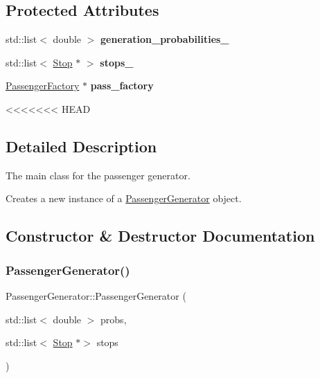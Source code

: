 \subsection*{Protected Attributes}
\begin{DoxyCompactItemize}
\item 
\mbox{\label{classPassengerGenerator_a855471e5532fec3f387a6340f928d43a}} 
std\+::list$<$ double $>$ {\bfseries generation\+\_\+probabilities\+\_\+}
\item 
\mbox{\label{classPassengerGenerator_ab09ab7ca9104385ae007d05a6e957884}} 
std\+::list$<$ \hyperlink{classStop}{Stop} $\ast$ $>$ {\bfseries stops\+\_\+}
\item 
\mbox{\label{classPassengerGenerator_a3fb4e7939da69cd257680761488f39ac}} 
\hyperlink{classPassengerFactory}{Passenger\+Factory} $\ast$ {\bfseries pass\+\_\+factory}
\end{DoxyCompactItemize}


<<<<<<< HEAD
\subsection{Detailed Description}
The main class for the passenger generator. 

Creates a new instance of a \hyperlink{classPassengerGenerator}{Passenger\+Generator} object. 

\subsection{Constructor \& Destructor Documentation}
\mbox{\label{classPassengerGenerator_a33eeed8b68d5d596ceef5381c697e49d}} 
\subsubsection{\texorpdfstring{Passenger\+Generator()}{PassengerGenerator()}}
{\footnotesize\ttfamily Passenger\+Generator\+::\+Passenger\+Generator (\begin{DoxyParamCaption}\item[{std\+::list$<$ double $>$}]{probs,  }\item[{std\+::list$<$ \hyperlink{classStop}{Stop} $\ast$$>$}]{stops }\end{DoxyParamCaption})}



